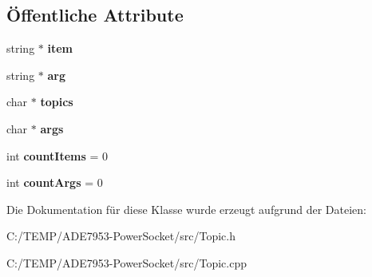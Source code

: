 \subsection*{Öffentliche Attribute}
\begin{DoxyCompactItemize}
\item 
\mbox{\label{class_topic_a5734fadd98a2cce17238891a7910aef4}} 
string $\ast$ {\bfseries item}
\item 
\mbox{\label{class_topic_af5e7eb036a84af9515d1463152bf5a4c}} 
string $\ast$ {\bfseries arg}
\item 
\mbox{\label{class_topic_af6b484a1ad52debc304c84a53560a324}} 
char $\ast$ {\bfseries topics}
\item 
\mbox{\label{class_topic_ab30006d032a999fa1c81653b1a6c956d}} 
char $\ast$ {\bfseries args}
\item 
\mbox{\label{class_topic_a0051cfe99f9f26dcdb9b3480d186afd9}} 
int {\bfseries count\+Items} = 0
\item 
\mbox{\label{class_topic_ab85b1147f2b466a0cbe2dfed2d719fdd}} 
int {\bfseries count\+Args} = 0
\end{DoxyCompactItemize}


Die Dokumentation für diese Klasse wurde erzeugt aufgrund der Dateien\+:\begin{DoxyCompactItemize}
\item 
C\+:/\+T\+E\+M\+P/\+A\+D\+E7953-\/\+Power\+Socket/src/Topic.\+h\item 
C\+:/\+T\+E\+M\+P/\+A\+D\+E7953-\/\+Power\+Socket/src/Topic.\+cpp\end{DoxyCompactItemize}
